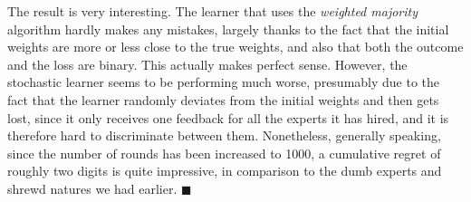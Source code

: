 \documentclass{article}
\newcommand{\qed}{\hfill$\blacksquare$}
\begin{document}
The result is very interesting. The learner that uses the {\it weighted majority} algorithm hardly
makes any mistakes, largely thanks to the fact that the initial weights are more or less close to the
true weights, and also that both the outcome and the loss are binary. This actually makes perfect sense. 
However, the stochastic learner seems to be performing much worse, presumably due to the fact that
the learner randomly deviates from the initial weights and then gets lost, since it only receives
one feedback for all the experts it has hired, and it is therefore hard to discriminate between them. 
Nonetheless, generally speaking, since the number of rounds has been increased to 1000, a cumulative regret
of roughly two digits is quite impressive, in comparison to the dumb experts and shrewd natures we had earlier. \qed


		
\end{document}
